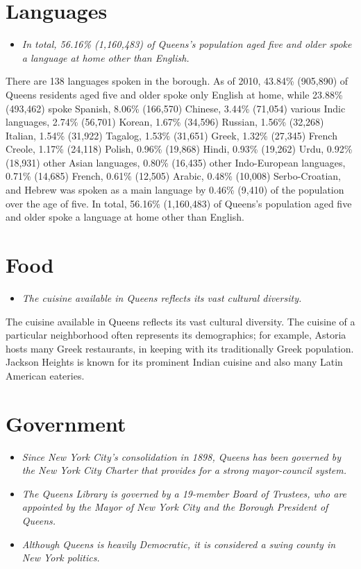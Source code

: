 \section{Languages}\label{languages}

\begin{itemize}
\item
  \emph{In total, 56.16\% (1,160,483) of Queens's population aged five
  and older spoke a language at home other than English.}
\end{itemize}

There are 138 languages spoken in the borough. As of 2010, 43.84\%
(905,890) of Queens residents aged five and older spoke only English at
home, while 23.88\% (493,462) spoke Spanish, 8.06\% (166,570) Chinese,
3.44\% (71,054) various Indic languages, 2.74\% (56,701) Korean, 1.67\%
(34,596) Russian, 1.56\% (32,268) Italian, 1.54\% (31,922) Tagalog,
1.53\% (31,651) Greek, 1.32\% (27,345) French Creole, 1.17\% (24,118)
Polish, 0.96\% (19,868) Hindi, 0.93\% (19,262) Urdu, 0.92\% (18,931)
other Asian languages, 0.80\% (16,435) other Indo-European languages,
0.71\% (14,685) French, 0.61\% (12,505) Arabic, 0.48\% (10,008)
Serbo-Croatian, and Hebrew was spoken as a main language by 0.46\%
(9,410) of the population over the age of five. In total, 56.16\%
(1,160,483) of Queens's population aged five and older spoke a language
at home other than English.

\section{Food}\label{food}

\begin{itemize}
\item
  \emph{The cuisine available in Queens reflects its vast cultural
  diversity.}
\end{itemize}

The cuisine available in Queens reflects its vast cultural diversity.
The cuisine of a particular neighborhood often represents its
demographics; for example, Astoria hosts many Greek restaurants, in
keeping with its traditionally Greek population. Jackson Heights is
known for its prominent Indian cuisine and also many Latin American
eateries.

\section{Government}\label{government}

\begin{itemize}
\item
  \emph{Since New York City's consolidation in 1898, Queens has been
  governed by the New York City Charter that provides for a strong
  mayor-council system.}
\item
  \emph{The Queens Library is governed by a 19-member Board of Trustees,
  who are appointed by the Mayor of New York City and the Borough
  President of Queens.}
\item
  \emph{Although Queens is heavily Democratic, it is considered a swing
  county in New York politics.}
\end{itemize}

